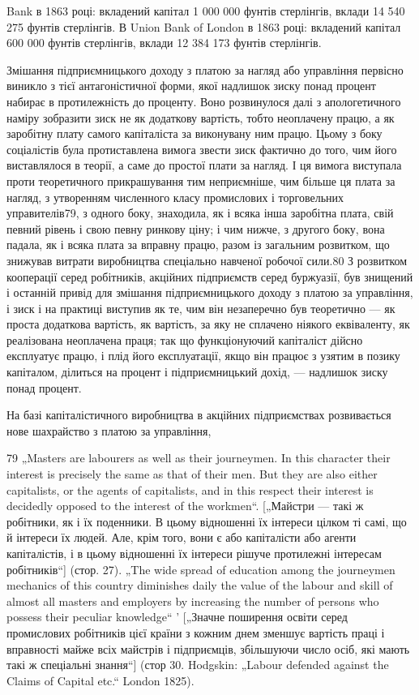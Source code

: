 Bank в 1863 році: вкладений капітал 1 000 000 фунтів стерлінгів,
вклади 14 540 275 фунтів стерлінгів. В Union Bank of London в
1863 році: вкладений капітал 600 000 фунтів стерлінгів, вклади
12 384 173 фунтів стерлінгів.

Змішання підприємницького доходу з платою за нагляд
або управління первісно виникло з тієї антагоністичної форми,
якої надлишок зиску понад процент набирає в протилежність
до проценту. Воно розвинулося далі з апологетичного наміру
зобразити зиск не як додаткову вартість, тобто неоплачену працю,
а як заробітну плату самого капіталіста за виконувану ним працю.
Цьому з боку соціалістів була протиставлена вимога звести зиск
фактично до того, чим його виставлялося в теорії, а саме до простої
плати за нагляд. І ця вимога виступала проти теоретичного
прикрашування тим неприємніше, чим більше ця плата за нагляд,
з утворенням численного класу промислових і торговельних
управителів79, з одного боку, знаходила, як і всяка інша заробітна
плата, свій певний рівень і свою певну ринкову ціну; і чим
нижче, з другого боку, вона падала, як і всяка плата за вправну
працю, разом із загальним розвитком, що знижував витрати виробництва
спеціально навченої робочої сили.80 З розвитком кооперації
серед робітників, акційних підприємств серед буржуазії,
був знищений і останній привід для змішання підприємницького
доходу з платою за управління, і зиск і на практиці
виступив як те, чим він незаперечно був теоретично — як проста
додаткова вартість, як вартість, за яку не сплачено ніякого
еквіваленту, як реалізована неоплачена праця; так що функціонуючий
капіталіст дійсно експлуатує працю, і плід його експлуатації,
якщо він працює з узятим в позику капіталом, ділиться на процент
і підприємницький дохід, — надлишок зиску понад процент.

На базі капіталістичного виробництва в акційних підприємствах
розвивається нове шахрайство з платою за управління,

79 „Masters are labourers as well as their journeymen. In this character their
interest is precisely the same as that of their men. But they are also either capitalists,
or the agents of capitalists, and in this respect their interest is decidedly
opposed to the interest of the workmen“. [„Майстри — такі ж робітники, як і їх
поденники. В цьому відношенні їх інтереси цілком ті самі, що й інтереси їх людей.
Але, крім того, вони є або капіталісти або агенти капіталістів, і в цьому відношенні
їх інтереси рішуче протилежні інтересам робітників“] (стор. 27). „The
wide spread of education among the journeymen mechanics of this country diminishes
daily the value of the labour and skill of almost all masters and employers
by increasing the number of persons who possess their peculiar knowledge“ ' [„Значне
поширення освіти серед промислових робітників цієї країни з кожним днем
зменшує вартість праці і вправності майже всіх майстрів і підприємців, збільшуючи
число осіб, які мають такі ж спеціальні знання“] (стор 30. Hodgskin:
„Labour defended against the Claims of Capital etc.“ London 1825).

